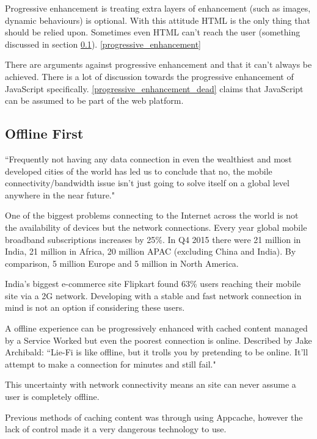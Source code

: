 Progressive enhancement is treating extra layers of enhancement (such as images, dynamic behaviours) is optional. With this attitude HTML is the only thing that should be relied upon. Sometimes even HTML can't reach the user (something discussed in section \ref{l-r--offline-first}). \ref{progressive_enhancement}

There are arguments against progressive enhancement and that it can't always be achieved. There is a lot of discussion towards the progressive enhancement of JavaScript specifically. \ref{progressive_enhancement_dead} claims that JavaScript can be assumed to be part of the web platform.

\subsection{Offline First} \label{l-r--offline-first}

``Frequently not having any data connection in even the wealthiest and most developed cities of the world has led us to conclude that no, the mobile connectivity/bandwidth issue isn’t just going to solve itself on a global level anywhere in the near future." \cite{hello_to_offline_first}

One of the biggest problems connecting to the Internet across the world is not the availability of devices but the network connections. Every year global mobile broadband subscriptions increases by 25\%. In Q4 2015 there were 21 million in India, 21 million in Africa, 20 million APAC (excluding China and India). By comparison, 5 million Europe and 5 million in North America. \cite{ericsson}

India's biggest e-commerce site Flipkart found 63\% users reaching their mobile site via a 2G network. \cite{flipkart} Developing with a stable and fast network connection in mind is not an option if considering these users.

A offline experience can be progressively enhanced with cached content managed by a Service Worked but even the poorest connection is online. Described by Jake Archibald: ``Lie-Fi is like offline, but it trolls you by pretending to be online. It'll attempt to make a connection for minutes and still fail." \cite{supercharging_page_load}

This uncertainty with network connectivity means an site can never assume a user is completely offline.

Previous methods of caching content was through using Appcache, however the lack of control made it a very dangerous technology to use. \cite{appcache}

